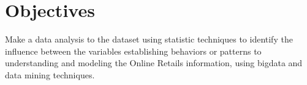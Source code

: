 \section{Objectives}
 Make a data analysis to the dataset using statistic techniques to identify the influence between the variables establishing behaviors or patterns to understanding and modeling the Online Retails information, using bigdata and data mining techniques.